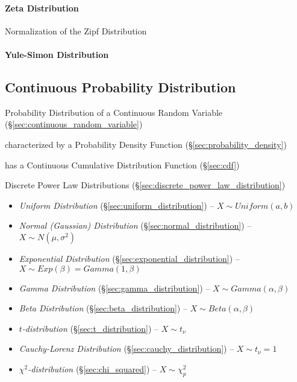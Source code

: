 \paragraph{Zeta Distribution}\label{sec:zeta_distribution}\hfill

Normalization of the Zipf Distribution

\paragraph{Yule-Simon Distribution}
\label{sec:yule_simon_distribution}\hfill



\subsection{Continuous Probability Distribution}
\label{sec:continuous_probability}

Probability Distribution of a Continuous Random Variable
(\S\ref{sec:continuous_random_variable})

characterized by a Probability Density Function
(\S\ref{sec:probability_density})

has a Continuous Cumulative Distribution Function (\S\ref{sec:cdf})

\fist Discrete Power Law Distributions
(\S\ref{sec:discrete_power_law_distribution})

\begin{itemize}
  \item \emph{Uniform Distribution} (\S\ref{sec:uniform_distribution}) --
    $X \sim Uniform(a,b)$
  \item \emph{Normal (Gaussian) Distribution} (\S\ref{sec:normal_distribution})
    -- $X \sim N(\mu, \sigma^2)$
  \item \emph{Exponential Distribution} (\S\ref{sec:exponential_distribution})
    -- $X \sim Exp(\beta) = Gamma(1, \beta)$
  \item \emph{Gamma Distribution} (\S\ref{sec:gamma_distribution})
    -- $X \sim Gamma(\alpha, \beta)$
  \item \emph{Beta Distribution} (\S\ref{sec:beta_distribution})
    -- $X \sim Beta(\alpha, \beta)$
  \item \emph{$t$-distribution} (\S\ref{sec:t_distribution})
    -- $X \sim t_\nu$
  \item \emph{Cauchy-Lorenz Distribution} (\S\ref{sec:cauchy_distribution})
    -- $X \sim t_\nu=1$
  \item \emph{$\chi^2$-distribution} (\S\ref{sec:chi_squared})
    -- $X \sim \chi^2_p$
\end{itemize}



